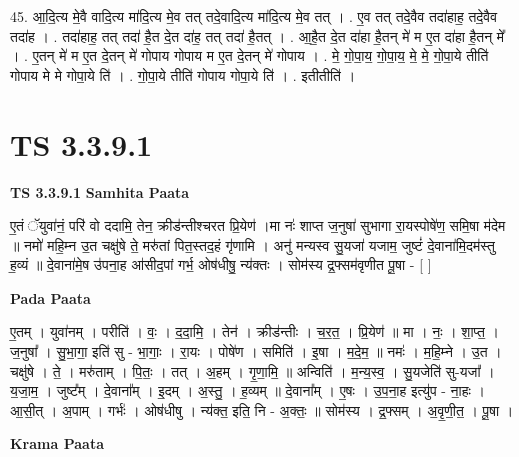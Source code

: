 \documentclass[17pt]{extarticle}
\begin{document}
45. आ॒दि॒त्य मे॒वै वादि॒त्य मा॑दि॒त्य मे॒व तत् तदे॒वादि॒त्य मा॑दि॒त्य मे॒व तत् । . ए॒व तत् तदे॒वैव तदा॑हाह॒ तदे॒वैव तदा॑ह । . तदा॑हाह॒ तत् तदा॑ है॒त दे॒त दा॑ह॒ तत् तदा॑ है॒तत् । . आ॒है॒त दे॒त दा॑हा है॒तन् मे॑ म ए॒त दा॑हा है॒तन् मे᳚ । . ए॒तन् मे॑ म ए॒त दे॒तन् मे॑ गोपाय गोपाय म ए॒त दे॒तन् मे॑ गोपाय । . मे॒ गो॒पा॒य॒ गो॒पा॒य॒ मे॒ मे॒ गो॒पा॒ये तीति॑ गोपाय मे मे गोपा॒ये ति॑ । . गो॒पा॒ये तीति॑ गोपाय गोपा॒ये ति॑ । . इतीतीति॑ । \newline
\pagebreak
{}

\section{ TS 3.3.9.1 }

\textbf{TS 3.3.9.1 } \newline
\textbf{Samhita Paata} \newline

ए॒तं ॅयुवा॑नं॒ परि॑ वो ददामि॒ तेन॒ क्रीड॑न्तीश्चरत प्रि॒येण॑ ।मा नः॑ शाप्त ज॒नुषा॑ सुभागा रा॒यस्पोषे॑ण॒ समि॒षा म॑देम ॥ नमो॑ महि॒म्न उ॒त चक्षु॑षे ते॒ मरु॑तां पित॒स्तद॒हं गृ॑णामि । अनु॑ मन्यस्व सु॒यजा॑ यजाम॒ जुष्टं॑ दे॒वाना॑मि॒दम॑स्तु ह॒व्यं ॥ दे॒वाना॑मे॒ष उ॑पना॒ह आ॑सीद॒पां गर्भ॒ ओष॑धीषु॒ न्य॑क्तः । सोम॑स्य द्र॒फ्सम॑वृणीत पू॒षा - [  ] \newline

\textbf{Pada Paata} \newline

ए॒तम् । युवा॑नम् । परीति॑ । वः॒ । द॒दा॒मि॒ । तेन॑ । क्रीड॑न्तीः । च॒र॒त॒ । प्रि॒येण॑ ॥ मा । नः॒ । शा॒प्त॒ । ज॒नुषा᳚ । सु॒भा॒गा॒ इति॑ सु - भा॒गाः॒ । रा॒यः । पोषे॑ण । समिति॑ । इ॒षा । म॒दे॒म॒ ॥ नमः॑ । म॒हि॒म्ने । उ॒त । चक्षु॑षे । ते॒ । मरु॑ताम् । पि॒तः॒ । तत् । अ॒हम् । गृ॒णा॒मि॒ ॥ अन्विति॑ । म॒न्य॒स्व॒ । सु॒यजेति॑ सु-यजा᳚ । य॒जा॒म॒ । जुष्ट᳚म् । दे॒वाना᳚म् । इ॒दम् । अ॒स्तु॒ । ह॒व्यम् ॥ दे॒वाना᳚म् । ए॒षः । उ॒प॒ना॒ह इत्यु॑प - ना॒हः । आ॒सी॒त् । अ॒पाम् । गर्भः॑ । ओष॑धीषु । न्य॑क्त॒ इति॒ नि - अ॒क्तः॒ ॥ सोम॑स्य । द्र॒फ्सम् । अ॒वृ॒णी॒त॒ । पू॒षा ।  \newline


\textbf{Krama Paata} \newline
\end{document}

